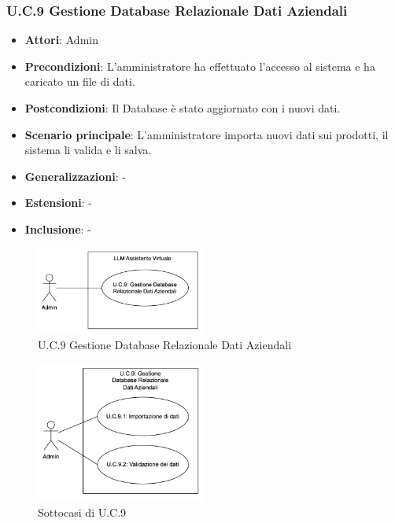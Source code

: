 \subsubsection{U.C.9 Gestione Database Relazionale Dati Aziendali}
\begin{itemize}
    \item \textbf{Attori}: Admin
    \item \textbf{Precondizioni}: L’amministratore ha effettuato l’accesso al sistema e ha caricato un file di dati.
    \item \textbf{Postcondizioni}: Il Database è stato aggiornato con i nuovi dati.
    \item \textbf{Scenario principale}: L’amministratore importa nuovi dati sui prodotti, il sistema li valida e li salva.
    \item \textbf{Generalizzazioni}: -
    \item \textbf{Estensioni}: -
    \item \textbf{Inclusione}: -
\end{itemize}
\begin{figure}[H]
    \centering
    \includegraphics[width=0.5\textwidth]{img/UC9.png}
    \caption{U.C.9 Gestione Database Relazionale Dati Aziendali}
\end{figure}
\begin{figure}[H]
    \centering
    \includegraphics[width=0.5\textwidth]{img/UC9p1.png}
    \caption{Sottocasi di U.C.9}
\end{figure}
